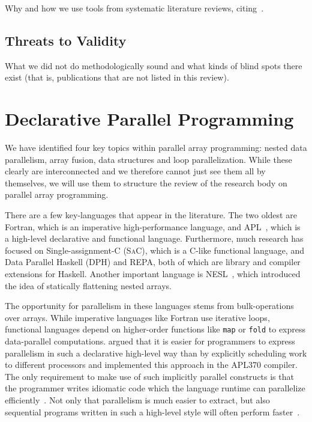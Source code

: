 \documentclass[a4paper]{article}
\newcommand{\sac}{S\textsc{a}C}
\begin{document}
Why and how we use tools from systematic literature reviews,
citing~\cite{keele2007guidelines, petersen2008systematic}.

\subsection{Threats to Validity}
\label{sec:threats-validity}

What we did not do methodologically sound and what kinds of blind
spots there exist (that is, publications that are not listed in this
review).

\section{Declarative Parallel Programming}
\label{sec:declarative-parallel-programming}

We have identified four key topics within parallel array programming:
nested data parallelism, array fusion, data structures and loop
parallelization. While these clearly are interconnected and we
therefore cannot just see them all by themselves, we will use them to
structure the review of the research body on parallel array
programming.

There are a few key-languages that appear in the literature. The two
oldest are Fortran, which is an imperative
high-performance language, and APL~\cite{Iverson1962Programming},
which is a high-level declarative and functional
language. Furthermore, much research has focused on
Single-assignment-C (\sac{}), which is a C-like
functional language, and Data Parallel Haskell (DPH) and
REPA, both of which are library and compiler extensions
for Haskell. Another important language is
NESL~\cite{Blelloch1993NESL}, which introduced the idea of statically
flattening nested arrays.

The opportunity for parallelism in these languages stems from
bulk-operations over arrays. While imperative languages like Fortran
use iterative loops, functional languages depend on higher-order
functions like \texttt{map} or \texttt{fold} to express data-parallel
computations. \citet{Ching:1990:APA:97808.97826} argued that it is
easier for programmers to express parallelism in such a declarative
high-level way than by explicitly scheduling work to different
processors and implemented this approach in the APL370 compiler. The
only requirement to make use of such implicitly parallel constructs is
that the programmer writes idiomatic code which the language runtime
can parallelize
efficiently~\cite{Bernecky:2015:AEP:2774959.2774962}. Not only that
parallelism is much easier to extract, but also sequential programs
written in such a high-level style will often perform
faster~\cite{Bernecky:2015:AEP:2774959.2774962}.
\end{document}
